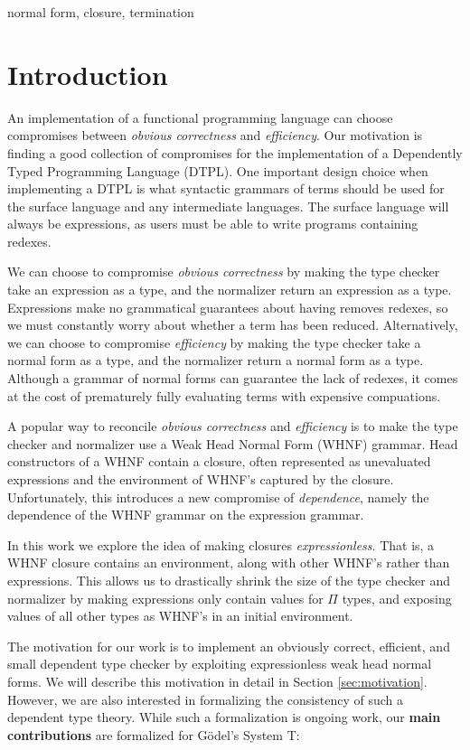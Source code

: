 \documentclass[preprint,authoryear]{sigplanconf}
\newcommand{\refsec}[1]{Section \ref{sec:#1}}
\begin{document}

\keywords
normal form, closure, termination

\section{Introduction}

An implementation of a functional programming language can choose
compromises between {\it obvious correctness} and {\it efficiency}. Our motivation is
finding a good collection of compromises for the
implementation of a Dependently Typed Programming Language (DTPL).
One important design choice when implementing a DTPL is what syntactic
grammars of terms should be used for the surface language and any
intermediate languages. The surface language will always be
expressions, as users must be able to write programs containing
redexes.

We can choose to compromise {\it obvious correctness} by making
the type checker take an expression as a type,
and the normalizer return an expression as a type. Expressions
make no grammatical guarantees about having removes redexes, so we
must constantly worry about whether a term has been reduced.
Alternatively, we can choose to compromise {\it efficiency} by making
the type checker take a normal form as a type, and the normalizer
return a normal form as a type. Although a grammar of normal forms can
guarantee the lack of redexes, it comes at the cost of prematurely
fully evaluating terms with expensive compuations.

A popular way to reconcile
{\it obvious correctness} and {\it efficiency} is to make
the type checker and normalizer use a
Weak Head Normal Form (WHNF) grammar. Head constructors of a WHNF
contain a closure, often represented as unevaluated expressions and the
environment of WHNF's captured by the closure. Unfortunately, this
introduces a new compromise of {\it dependence}, namely the dependence
of the WHNF grammar on the expression grammar.

In this work we explore the idea of making closures
{\it expressionless}. That is, a WHNF closure contains an environment,
along with other WHNF's rather than expressions. This allows us to
drastically shrink the size of the type checker and normalizer by
making expressions only contain values for $\Pi$ types, and exposing
values of all other types as WHNF's in an initial environment.

The motivation for our work is to implement an obviously correct,
efficient, and small dependent type checker by exploiting
expressionless weak head normal forms. We will describe this
motivation in detail in \refsec{motivation}. However, we are also
interested in formalizing the consistency of such a dependent type
theory. While such a formalization is ongoing work, our
{\bf main contributions} are formalized for G{\"o}del's System T:
\end{document}
